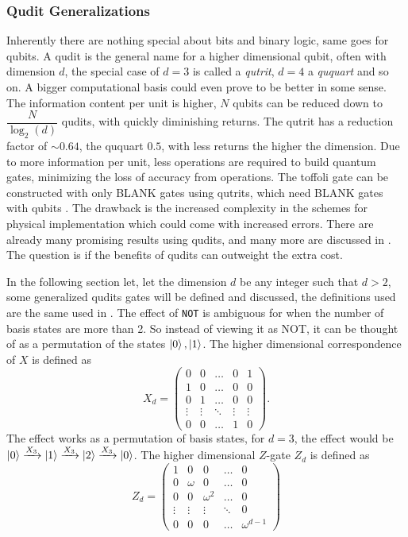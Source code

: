 \subsubsection{Qudit Generalizations}
Inherently there are nothing special about bits and binary logic, same goes for qubits.  A qudit is the general name for a higher dimensional qubit, often with dimension $d$, the special case of $d = 3 
$ is called a \textit{qutrit}, $d = 4$ a \textit{ququart} and so on. A bigger computational basis could even prove to be better in some sense. The information content per unit is higher, $N$ qubits can be reduced down to $\dfrac{N}{\log_2(d)}$ qudits\cite{info_qudit}, with quickly diminishing returns. The qutrit has a reduction factor of $\sim 0.64$, the ququart $0.5$, with less returns the higher the dimension. Due to more information per unit, less operations are required to build quantum gates, minimizing the loss of accuracy from operations. The toffoli gate can be constructed with only BLANK gates using qutrits, which need BLANK gates with qubits . The drawback is the increased complexity in the schemes for physical implementation which could come with increased errors. There are already many promising results using qudits\cite{qutrit1}\cite{qudit2}\cite{qudit3}, and many more are discussed in \cite{qudit}. The question is if the benefits of qudits can outweight the extra cost.

In the following section let, let the dimension $d$ be any integer such that $d > 2$, some generalized qudits gates will be defined and discussed, the definitions used are the same used in \cite{qudit}.
The effect of {\tt NOT} is ambiguous for when the number of basis states are more than 2. So instead of viewing it as NOT, it can be thought of as a permutation of the states $\ket{0},\ket{1}$. The higher dimensional correspondence of $X$ is defined as
\begin{equation}
X_d = \begin{pmatrix}
0 & 0 & \dots & 0 & 1\\
1 & 0 & \dots & 0 & 0\\
0 & 1 & \dots & 0 & 0\\
\vdots & \vdots &\ddots& \vdots&\vdots\\
0 & 0& \dots & 1 & 0
\end{pmatrix}.
\end{equation}
The effect works as a permutation of basis states, for $d = 3$, the effect would be $\ket{0} \xrightarrow{X_3} \ket{1} \xrightarrow{X_3} \ket{2} \xrightarrow{X_3} \ket{0}$.
The higher dimensional $Z$-gate $Z_d$ is defined as 
\begin{equation}
Z_d = \begin{pmatrix}
1 & 0 & 0 & \dots & 0 \\
0 & \omega & 0 &\dots & 0\\
0 & 0 & \omega^2&\dots & 0 \\
\vdots & \vdots&\vdots&\ddots& 0\\
0 & 0& 0&\dots  & \omega^{d-1}
\end{pmatrix}
\end{equation}

